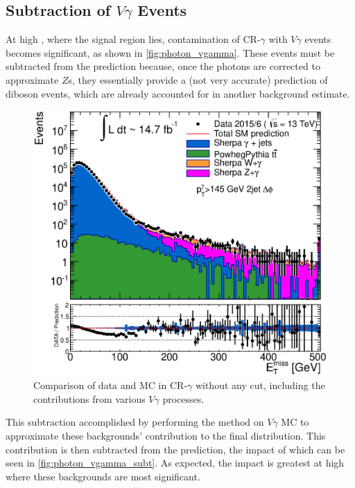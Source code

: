 \subsection{Subtraction of $V\gamma$ Events}

At high \met, where the signal region lies, contamination of CR-$\gamma$ with $V\gamma$ events becomes significant, as shown in \autoref{fig:photon_vgamma}. These events must be subtracted from the \gjets prediction because, once the photons are corrected to approximate $Z$s, they essentially provide a (not very accurate) prediction of diboson events, which are already accounted for in another background estimate. 

\begin{centering}
\begin{figure}[!hbt]
\myfloatalign
\includegraphics[width=.90\linewidth]{figures/photons/hPhot_Met_dPhiJet_hist.eps}
\caption{Comparison of data and \ac{MC} in CR-$\gamma$ without any \HT cut, including the contributions from various $V\gamma$ processes.}
\label{fig:photon_vgamma}
\end{figure}
\end{centering}

This subtraction accomplished by performing the \gjets method on $V\gamma$ \ac{MC} to approximate these backgrounds' contribution to the final \met distribution. This contribution is then subtracted from the \gjets prediction, the impact of which can be seen in \autoref{fig:photon_vgamma_subt}. As expected, the impact is greatest at high \met where these backgrounds are most significant.


